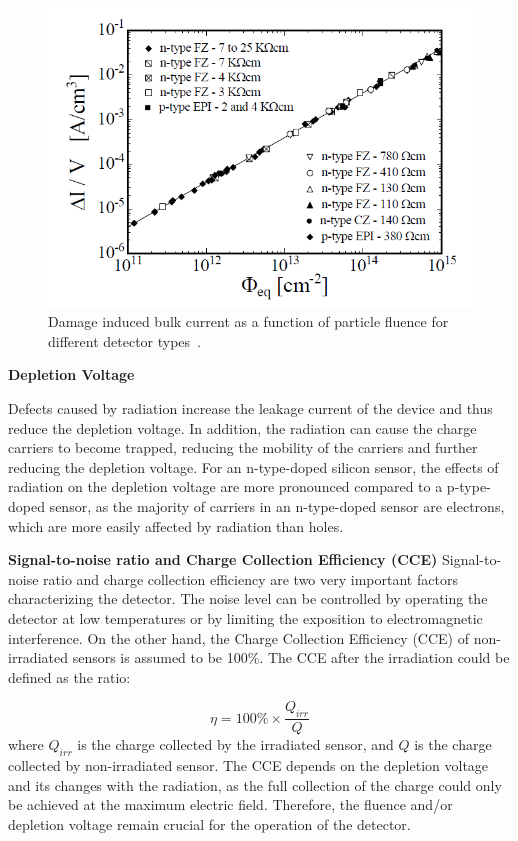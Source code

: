 \begin{figure}[!h]
\centering
\includegraphics[width=0.75\columnwidth]{Chapter2/images/lekage_current_fluence.png}
\caption{Damage induced bulk current as a function of particle fluence
for different detector types~\cite{Moll:1999kv}.}
\label{fig_leakage_theory}
\end{figure}
\textbf{Depletion Voltage}\bigbreak

Defects caused by radiation increase the leakage current of the device and thus reduce the depletion voltage. In addition, the radiation can cause the charge carriers to become trapped, reducing the mobility of the carriers and further reducing the depletion voltage. For an n-type-doped silicon sensor, the effects of radiation on the depletion voltage are more pronounced compared to a p-type-doped sensor, as the majority of carriers in an n-type-doped sensor are electrons, which are more easily affected by radiation than holes.  \bigbreak

\textbf{Signal-to-noise ratio and Charge Collection Efficiency (CCE)}\bigbreak
Signal-to-noise ratio and charge collection efficiency are two very important factors characterizing the detector. The noise level can be controlled by operating the detector at low temperatures or by limiting the exposition to electromagnetic interference. On the other hand, the Charge Collection Efficiency (CCE) of non-irradiated sensors is assumed to be 100\%. The CCE after the irradiation could be defined as the ratio:

\begin{equation}
    \eta = 100\%\times\frac{Q_{irr}}{Q}
\end{equation}
where $Q_{irr}$ is the charge collected by the irradiated sensor, and $Q$ is the charge collected by non-irradiated sensor. 
The CCE depends on the depletion voltage and its changes with the radiation, as the full collection of the charge could only be achieved at the maximum electric field. Therefore, the fluence and/or depletion voltage remain crucial for the operation of the detector. 


